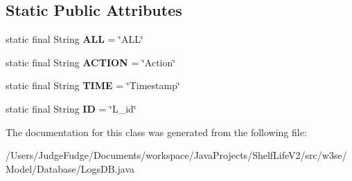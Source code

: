 \subsection*{Static Public Attributes}
\begin{DoxyCompactItemize}
\item 
\hypertarget{classw3se_1_1_model_1_1_database_1_1_logs_d_b_acea26594321ca47fef48156fbe36489d}{static final String {\bfseries A\-L\-L} = \char`\"{}A\-L\-L\char`\"{}}\label{classw3se_1_1_model_1_1_database_1_1_logs_d_b_acea26594321ca47fef48156fbe36489d}

\item 
\hypertarget{classw3se_1_1_model_1_1_database_1_1_logs_d_b_affd55c93cb814781b34e3166de2327fc}{static final String {\bfseries A\-C\-T\-I\-O\-N} = \char`\"{}Action\char`\"{}}\label{classw3se_1_1_model_1_1_database_1_1_logs_d_b_affd55c93cb814781b34e3166de2327fc}

\item 
\hypertarget{classw3se_1_1_model_1_1_database_1_1_logs_d_b_a6836dceb5e094ee109609fab3fc27e8b}{static final String {\bfseries T\-I\-M\-E} = \char`\"{}Timestamp\char`\"{}}\label{classw3se_1_1_model_1_1_database_1_1_logs_d_b_a6836dceb5e094ee109609fab3fc27e8b}

\item 
\hypertarget{classw3se_1_1_model_1_1_database_1_1_logs_d_b_a3073b8f3deea0407610104c37b06c03b}{static final String {\bfseries I\-D} = \char`\"{}L\-\_\-id\char`\"{}}\label{classw3se_1_1_model_1_1_database_1_1_logs_d_b_a3073b8f3deea0407610104c37b06c03b}

\end{DoxyCompactItemize}


The documentation for this class was generated from the following file\-:\begin{DoxyCompactItemize}
\item 
/\-Users/\-Judge\-Fudge/\-Documents/workspace/\-Java\-Projects/\-Shelf\-Life\-V2/src/w3se/\-Model/\-Database/Logs\-D\-B.\-java\end{DoxyCompactItemize}
